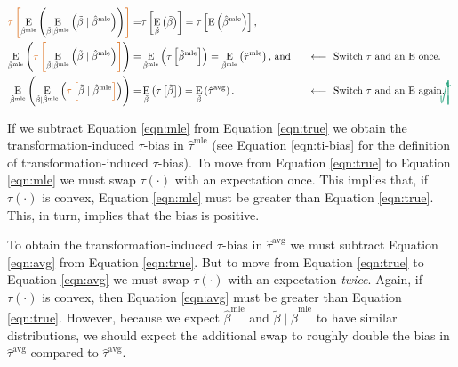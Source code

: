 \documentclass[11pt]{article}
\DeclareMathOperator*{\E}{\text{E}}
\newcommand{\tikzmark}[1]{\tikz[overlay,remember picture] \node (#1) {};}
\newcommand{\DrawBox}[2]{%
  \begin{tikzpicture}[overlay,remember picture]
    \draw[->,shorten >= 6pt, shorten <= 2pt, out=-90, in=90, distance=1.2cm, color2, thick] (MarkA.east) to (MarkB.east);
    \draw[->,shorten >= 6pt, shorten <= 2pt, out=-90, in=90, distance=1cm, color2, thick] (MarkC.west) to (MarkD.east);
  \end{tikzpicture}
}
\newcommand{\justif}[2]{&{#1}&\text{#2}}
\begin{document}
\begin{alignat}{2}
 \color{color1} \tikzmark{MarkA}\tau \left[ \normalcolor \E_{\hat{\beta}^\text{mle}}\left( \E_{\tilde{\beta} \mid \hat{\beta}^\text{mle}} \left( \tilde{\beta} \mid \hat{\beta}^\text{mle} \right) \right) \color{color1} \right] \normalcolor =&  \tau \left[ \E_{\tilde{\beta}} \left( \tilde{\beta} \right) \right] = \tau \left[\E \left( \hat{\beta}^\text{mle} \right) \right]\text{,} \label{eqn:true}\\
 \E_{\hat{\beta}^\text{mle}}\left( \color{color1} \tikzmark{MarkB}\tau\tikzmark{MarkC} \left[ \normalcolor \E_{\tilde{\beta} \mid \hat{\beta}^\text{mle}} \left( \tilde{\beta} \mid \hat{\beta}^\text{mle} \right) \color{color1} \right] \normalcolor \right)  =&  \E_{\hat{\beta}^\text{mle}} \left( \tau \left[\hat{\beta}^\text{mle} \right] \right) =  \E_{\hat{\beta}^\text{mle}} \left(\hat{\tau}^\text{mle} \right) \text{, and} \justif{\quad}{$\longleftarrow~$ Switch $\tau$ and an $\E$ once.} \label{eqn:mle}\\
\E_{\hat{\beta}^\text{mle}}\left( \E_{\tilde{\beta} \mid \hat{\beta}^\text{mle}} \left( \color{color1} \tikzmark{MarkD}\tau \left[ \normalcolor \tilde{\beta} \mid \hat{\beta}^\text{mle} \color{color1} \right] \normalcolor \right) \right)  =&
\E_{\tilde{\beta}} \left( \tau \left[\tilde{\beta} \right] \right)  =
\E_{\tilde{\beta}} \left(\hat{\tau}^\text{avg} \right) \text{.}\justif{\quad}{$\longleftarrow~$ Switch $\tau$ and an $\E$ again.}\label{eqn:avg}\DrawBox{red}{blue}
\end{alignat}

If we subtract Equation \ref{eqn:mle} from Equation \ref{eqn:true} we obtain the transformation-induced $\tau$-bias in $\hat{\tau}^\text{mle}$ (see Equation \ref{eqn:ti-bias} for the definition of transformation-induced $\tau$-bias).
To move from Equation \ref{eqn:true} to Equation \ref{eqn:mle} we must swap $\tau(\cdot)$ with an expectation once. This implies that, if $\tau(\cdot)$ is convex, Equation \ref{eqn:mle} must be greater than Equation \ref{eqn:true}.
This, in turn, implies that the bias is positive.

To obtain the transformation-induced $\tau$-bias in $\hat{\tau}^\text{avg}$ we must subtract Equation \ref{eqn:avg} from Equation \ref{eqn:true}. But to move from Equation \ref{eqn:true} to Equation \ref{eqn:avg} we must swap $\tau(\cdot)$ with an expectation \emph{twice}. Again, if $\tau(\cdot)$ is convex, then Equation \ref{eqn:avg} must be greater than Equation \ref{eqn:true}. However, because we expect $\hat{\beta}^\text{mle}$ and $\tilde{\beta} \mid \hat{\beta}^\text{mle}$ to have similar distributions, we should expect the additional swap to roughly double the bias in $\hat{\tau}^\text{avg}$ compared to $\hat{\tau}^\text{avg}$.
\end{document}

